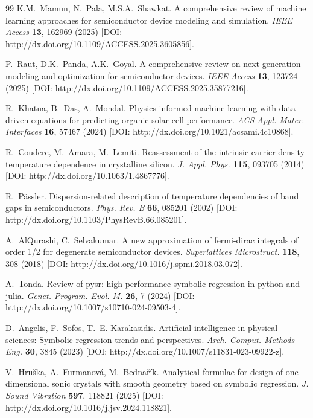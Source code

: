 \documentclass[fleqn,twoside,twocolumn,nofootinbib,showkeys]{revtex4} %
\begin{document}
\begin{thebibliography}{99}
K.M.~Mamun, N.~Pala, M.S.A.~Shawkat. A comprehensive review of machine learning approaches for semiconductor device modeling and simulation. \textit{IEEE Access} \textbf{13}, 162969 (2025) [DOI: http://dx.doi.org/10.1109/ACCESS.2025.3605856].

P.~Raut, D.K.~Panda, A.K.~Goyal. A comprehensive review on next-generation modeling and optimization for semiconductor devices. \textit{IEEE Access} \textbf{13}, 123724 (2025) [DOI: http://dx.doi.org/10.1109/ACCESS.2025.35877216].

R.~Khatua, B.~Das, A.~Mondal. Physics-informed machine learning with data-driven equations for predicting organic solar cell performance. \textit{ACS Appl. Mater. Interfaces} \textbf{16}, 57467 (2024) [DOI: http://dx.doi.org/10.1021/acsami.4c10868].

R.~Couderc, M.~Amara, M.~Lemiti. Reassessment of the intrinsic carrier density temperature dependence in crystalline silicon. \textit{J. Appl. Phys.} \textbf{115}, 093705 (2014) [DOI: http://dx.doi.org/10.1063/1.4867776].

R.~P\"assler. Dispersion-related description of temperature dependencies of band gaps in semiconductors. \textit{Phys. Rev. B} \textbf{66}, 085201 (2002) [DOI: http://dx.doi.org/10.1103/PhysRevB.66.085201].

A.~AlQurashi, C.~Selvakumar. A new approximation of fermi-dirac integrals of order 1/2 for degenerate semiconductor devices. \textit{Superlattices Microstruct.} \textbf{118}, 308 (2018) [DOI: http://dx.doi.org/10.1016/j.spmi.2018.03.072].

A.~Tonda. Review of pysr: high-performance symbolic regression in python and julia. \textit{Genet. Program. Evol. M.} \textbf{26}, 7 (2024) [DOI: http://dx.doi.org/10.1007/s10710-024-09503-4].

D.~Angelis, F.~Sofos, T.~E. Karakasidis. Artificial intelligence in physical sciences: Symbolic regression trends and perspectives. \textit{Arch. Comput. Methods Eng.} \textbf{30}, 3845 (2023) [DOI: http://dx.doi.org/10.1007/s11831-023-09922-z].

V.~Hruška, A.~Furmanová, M.~Bednařík. Analytical formulae for design of one-dimensional sonic crystals with smooth geometry based on symbolic regression. \textit{J. Sound Vibration} \textbf{597}, 118821 (2025) [DOI: http://dx.doi.org/10.1016/j.jsv.2024.118821].


\end{thebibliography}
\end{document}
